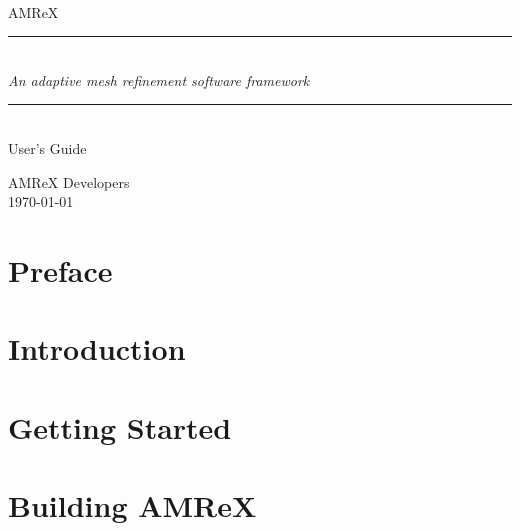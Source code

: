 \documentclass[11pt]{book}
\makeatletter
\newcommand{\HRule}{\rule{\linewidth}{0.125mm}}
\renewcommand*\cleardoublepage{\clearpage\if@twoside
\ifodd\c@page\else
\hbox{}
\thispagestyle{empty}
\newpage
\if@twocolumn\hbox{}\newpage\fi\fi\fi}
\makeatother
\begin{document}
\frontmatter

\begin{titlepage}
\begin{center}
\ \\[3in]
{\sf \Huge AMReX}
\ \\[0.2in]

\begin{minipage}{5.5in}
\HRule\\[2mm]
\centering
{\Large \em An adaptive mesh refinement software framework}

\HRule
\end{minipage}

\ \\[.5 in]
{\sf \huge User's Guide}

\vfill

{\large AMReX Developers}
\ \\[0.3 in]
{\large \today}
\end{center}

\end{titlepage}



\setcounter{tocdepth}{2}
\tableofcontents

\clearpage

\listoffigures
{}

\clearpage

\listoftables
{}


\cleardoublepage

\chapter*{Preface}


\mainmatter

\chapter{Introduction}\label{Chap:Introduction}


\chapter{Getting Started}\label{Chap:GettingStarted}


\chapter{Building AMReX}\label{Chap:BuildingAMReX}

\end{document}
